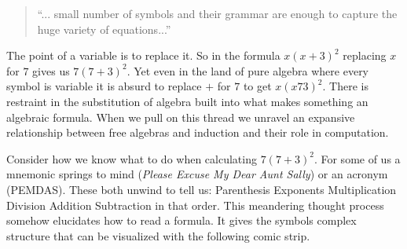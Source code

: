 
\begin{quote}
``... small number
of symbols and their grammar are enough to capture the huge
variety of equations...''
\end{quote}

The point of a variable is to replace it.  So in the formula 
$x(x+3)^2$ replacing $x$ for $7$ gives us $7(7+3)^2$.  
Yet even in the land of pure algebra where every symbol is variable it is absurd to
replace $+$ for $7$ to get $x(x73)^2$.   There is restraint in the substitution
of algebra built into what makes something an algebraic formula. When we pull 
on this thread we unravel an expansive relationship between free algebras and induction
and their role in computation.


Consider how we know what to do when   
calculating $7(7+3)^2$.  For some of us a mnemonic springs to mind
(\emph{Please Excuse My Dear Aunt Sally}) or an acronym (PEMDAS).
These both unwind to tell us: Parenthesis Exponents Multiplication Division Addition Subtraction
in that order. This meandering thought process somehow elucidates how to read a formula. 
It gives the symbols complex structure that 
can be visualized with the following comic strip.
